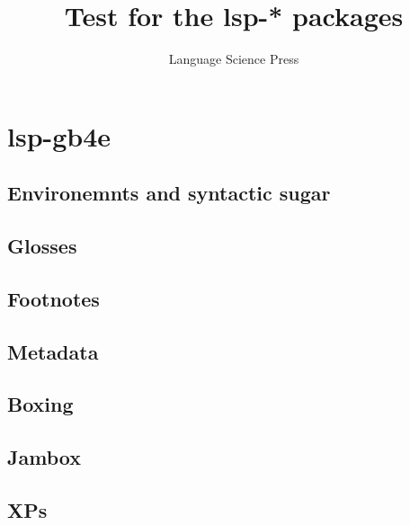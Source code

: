 \documentclass[biblatex]{LSP/langsci}
\title{Test for the lsp-* packages}
\author{Language Science Press}
\begin{document}
\maketitle

\section{lsp-gb4e}
\subsection{Environemnts and syntactic sugar}

% 







\subsection{Glosses}


% 



\subsection{Footnotes}




\subsection{Metadata}

\subsection{Boxing}

% 
\subsection{Jambox}



\subsection{XPs}

% 
% 
% 
\end{document}
